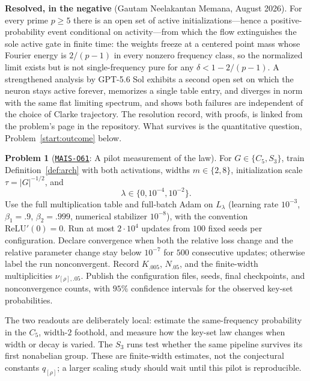 \documentclass[11pt]{amsart}
\newcommand{\Oid}[1]{\href{https://github.com/lionellevine/MAIS/blob/main/open-problems/MAIS-O#1.md}{\texttt{MAIS-O#1}}}
\theoremstyle{plain}
\theoremstyle{definition}
\newtheorem{problem}[theorem]{Problem}
\begin{document}
\medskip
\noindent\textbf{Resolved, in the negative} (Gautam Neelakantan Memana, August 2026). For every prime $p \ge 5$ there is an open set of active initializations---hence a positive-probability event conditional on activity---from which the flow extinguishes the sole active gate in finite time: the weights freeze at a centered point mass whose Fourier energy is $2/(p-1)$ in every nonzero frequency class, so the normalized limit exists but is not single-frequency pure for any $\delta < 1 - 2/(p-1)$. A strengthened analysis by GPT-5.6 Sol exhibits a second open set on which the neuron stays active forever, memorizes a single table entry, and diverges in norm with the same flat limiting spectrum, and shows both failures are independent of the choice of Clarke trajectory. The resolution record, with proofs, is linked from the problem's page in the repository. What survives is the quantitative question, Problem~\ref{start:outcome} below.

\begin{problem}[\Oid{61}: A pilot measurement of the law]\label{start:measure}
For $G\in\{C_5,S_3\}$, train Definition~\ref{def:arch} with both activations, widths $m\in\{2,8\}$, initialization scale $\tau=|G|^{-1/2}$, and
\[
\lambda\in\{0,10^{-4},10^{-2}\}.
\]
Use the full multiplication table and full-batch Adam on $L_\lambda$ (learning rate $10^{-3}$, $\beta_1=.9$, $\beta_2=.999$, numerical stabilizer $10^{-8}$), with the convention $\mathrm{ReLU}'(0)=0$. Run at most $2\cdot10^4$ updates from $100$ fixed seeds per configuration. Declare convergence when both the relative loss change and the relative parameter change stay below $10^{-7}$ for $500$ consecutive updates; otherwise label the run nonconvergent. Record $K_{.005}$, $N_{.05}$, and the finite-width multiplicities $\nu_{[\rho],.05}$. Publish the configuration files, seeds, final checkpoints, and nonconvergence counts, with $95\%$ confidence intervals for the observed key-set probabilities.

The two readouts are deliberately local: estimate the same-frequency probability in the $C_5$, width-$2$ foothold, and measure how the key-set law changes when width or decay is varied. The $S_3$ runs test whether the same pipeline survives its first nonabelian group. These are finite-width estimates, not the conjectural constants $q_{[\rho]}$; a larger scaling study should wait until this pilot is reproducible.
\end{problem}
\end{document}
